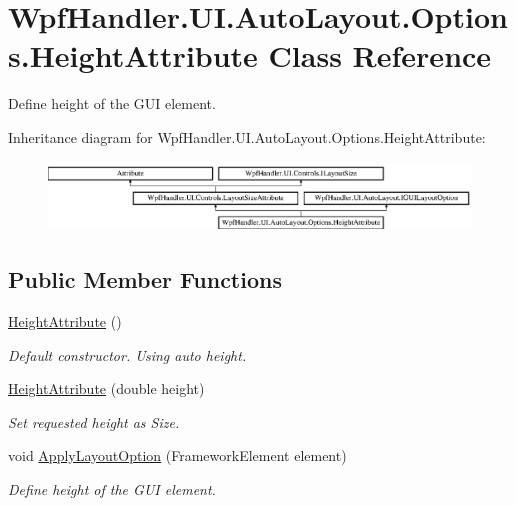 \hypertarget{class_wpf_handler_1_1_u_i_1_1_auto_layout_1_1_options_1_1_height_attribute}{}\section{Wpf\+Handler.\+U\+I.\+Auto\+Layout.\+Options.\+Height\+Attribute Class Reference}
\label{class_wpf_handler_1_1_u_i_1_1_auto_layout_1_1_options_1_1_height_attribute}


Define height of the G\+UI element.  


Inheritance diagram for Wpf\+Handler.\+U\+I.\+Auto\+Layout.\+Options.\+Height\+Attribute\+:\begin{figure}[H]
\begin{center}
\leavevmode
\includegraphics[height=1.842105cm]{d8/d4b/class_wpf_handler_1_1_u_i_1_1_auto_layout_1_1_options_1_1_height_attribute}
\end{center}
\end{figure}
\subsection*{Public Member Functions}
\begin{DoxyCompactItemize}
\item 
\mbox{\hyperlink{class_wpf_handler_1_1_u_i_1_1_auto_layout_1_1_options_1_1_height_attribute_a95fb727e17f5d821370948bfc7ee33a3}{Height\+Attribute}} ()
\begin{DoxyCompactList}\small\item\em Default constructor. Using auto height. \end{DoxyCompactList}\item 
\mbox{\hyperlink{class_wpf_handler_1_1_u_i_1_1_auto_layout_1_1_options_1_1_height_attribute_a96c546720b620ae0b867c25992bad3d6}{Height\+Attribute}} (double height)
\begin{DoxyCompactList}\small\item\em Set requested height as Size. \end{DoxyCompactList}\item 
void \mbox{\hyperlink{class_wpf_handler_1_1_u_i_1_1_auto_layout_1_1_options_1_1_height_attribute_a221d69c339ceb5cd3e16d8e59f216cc9}{Apply\+Layout\+Option}} (Framework\+Element element)
\begin{DoxyCompactList}\small\item\em Define height of the G\+UI element. \end{DoxyCompactList}\end{DoxyCompactItemize}
